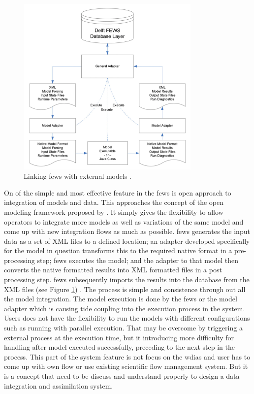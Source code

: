 \begin{figure}[htp]
    \centering
    \includegraphics[width=0.8\textwidth]{lit/fews/Linking-Delft-FEWS-with-external-models-The-fi-gure-shows-the-fl-ow-of-data-through-XML_W640.png}
    \caption[Linking \acrshort{fews} with external models]{Linking \acrshort{fews} with external models \cite{Werner2013TheSystem}.}
    \label{fi:fews_general_adapter}
\end{figure}
On of the simple and most effective feature in the \acrshort{fews} is open approach to integration of models and data. This approaches the concept of the open modeling framework proposed by \cite{Kokkonen2003InterfacingXML}. It simply gives the flexibility to allow operators to integrate more models as well as variations of the same model and come up with new integration flows as much as possible.
\acrshort{fews} generates the input data as a set of XML files to a defined location; an adapter developed specifically for the model in question transforms this to the required native format in a pre-processing step; \acrshort{fews} executes the model; and the adapter to that model then converts the native formatted results into XML formatted files in a post processing step. \acrshort{fews} subsequently imports the results into the database from the XML files (see Figure \ref{fi:fews_general_adapter}) \cite{Werner2013TheSystem}. The process is simple and consistence through out all the model integration. The model execution is done by the \acrshort{fews} or the model adapter which is causing tide coupling into the execution process in the system. Users does not have the flexibility to run the models with different configurations such as running with parallel execution. That may be overcome by triggering a external process at the execution time, but it introducing more difficulty for handling after model executed successfully, preceding to the next step in the process. This part of the system feature is not focus on the \acrshort{wdias} and user has to come up with own flow or use existing scientific flow management system. But it is a concept that need to be discuss and understand properly to design a data integration and assimilation system.

